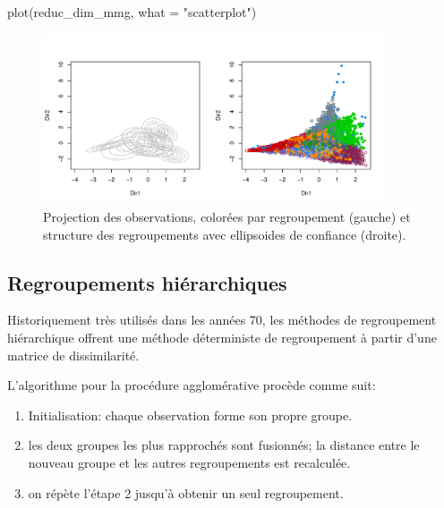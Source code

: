 \documentclass[
  11pt,
  letterpaper,
]{scrbook}
\newenvironment{Shaded}{\begin{snugshade}}{\end{snugshade}}
\newcommand{\AttributeTok}[1]{\textcolor[rgb]{0.40,0.45,0.13}{#1}}
\newcommand{\FunctionTok}[1]{\textcolor[rgb]{0.28,0.35,0.67}{#1}}
\newcommand{\NormalTok}[1]{\textcolor[rgb]{0.00,0.23,0.31}{#1}}
\newcommand{\StringTok}[1]{\textcolor[rgb]{0.13,0.47,0.30}{#1}}
\providecommand{\tightlist}{%
  \setlength{\itemsep}{0pt}\setlength{\parskip}{0pt}}\usepackage{longtable,booktabs,array}
\theoremstyle{definition}
\theoremstyle{remark}
\begin{document}
\begin{Shaded}
\begin{Highlighting}[]
\FunctionTok{plot}\NormalTok{(reduc\_dim\_mmg, }\AttributeTok{what =} \StringTok{"scatterplot"}\NormalTok{)}
\end{Highlighting}
\end{Shaded}

\begin{figure}[ht!]

{\centering \includegraphics[width=0.9\textwidth,height=\textheight]{./03-regroupements_files/figure-pdf/fig-classifreducmclust-1.pdf}

}

\caption{\label{fig-classifreducmclust}Projection des observations,
colorées par regroupement (gauche) et structure des regroupements avec
ellipsoides de confiance (droite).}

\end{figure}

\hypertarget{regroupements-hiuxe9rarchiques}{%
\subsection{Regroupements
hiérarchiques}\label{regroupements-hiuxe9rarchiques}}

Historiquement très utilisés dans les années 70, les méthodes de
regroupement hiérarchique offrent une méthode déterministe de
regroupement à partir d'une matrice de dissimilarité.

L'algorithme pour la procédure agglomérative procède comme suit:

\begin{enumerate}
\def\labelenumi{\arabic{enumi}.}
\tightlist
\item
  Initialisation: chaque observation forme son propre groupe.
\item
  les deux groupes les plus rapprochés sont fusionnés; la distance entre
  le nouveau groupe et les autres regroupements est recalculée.
\item
  on répète l'étape 2 jusqu'à obtenir un seul regroupement.
\end{enumerate}
\end{document}
